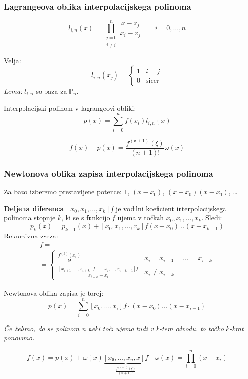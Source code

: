\begin{multicols}{5}
\subsubsection*{Lagrangeova oblika interpolacijskega polinoma}
\[ l_{i, n}(x) = \prod_{\substack{j=0 \\ j\neq i}}^n \frac{x-x_j}{x_i - x_j} \qquad i = 0, \dots, n \]

Velja:
\[ 
l_{i,n}(x_j) = 
\begin{cases}
    1 & i = j \\
    0 & \text{sicer}
\end{cases}
\]
\textit{Lema:} $l_{i, n}$ so baza za $\mathbb{P}_n$.
%

Interpolacijski polinom v lagrangeovi obliki:
\[ p(x) = \sum_{i=0}^n f(x_i) l_{i,n}(x)\]

\[ f(x) - p(x) = \frac{f^{(n+1)}(\xi)}{(n+1)!} \omega(x) \]

\subsubsection*{Newtonova oblika zapisa interpolacijskega polinoma}

Za bazo izberemo prestavljene potence: $1$, $(x-x_0)$, $(x-x_0)(x-x_1)$, \dots  


\textbf{Deljena diferenca} $[x_0, x_1, \dots, x_k] f$ je vodilni koeficient interpolacijskega polinoma
stopnje $k$, ki se s funkcijo $f$ ujema v točkah $x_0, x_1, \dots, x_k$. Sledi:
\[ p_k(x) = p_{k-1}(x) + [x_0, x_1, \dots, x_k] f (x-x_0)\dots (x-x_{k-1})\]
Rekurzivna zveza:
\begin{multline*}
    [x_i, x_{i+1}, \dots, x_{i+k}]f = \\
    = \begin{cases}
        \frac{f^{(k)}(x_i)}{k!} & {\scriptstyle x_i = x_{i+1} = \dots = x_{i+k}} \\
        \frac{[x_{i+1}, \dots, x_{i+k}]f- [x_i, \dots, x_{i+k-1}]f}{x_{i+k}-x_i} & {\scriptstyle x_i \neq x_{i+k} }
    \end{cases} 
\end{multline*} 

Newtonova oblika zapisa je torej:
\[ p(x) = \sum_{i=0}^n [x_0, \dots, x_i]f \cdot (x-x_0)\dots (x-x_{i-1}) \]

\textit{Če želimo, da se polinom n neki toči ujema tudi v $k$-tem odvodu, to točko $k$-krat ponovimo.}

\[ f(x) = p(x) + \omega(x) \underbrace{[x_0, \dots, x_n, x] f}_{\frac{f^{(n+1)}(\xi)}{(n+1)!}} \quad \omega(x) = \prod_{i=0}^n (x-x_i)\]


\end{multicols}

